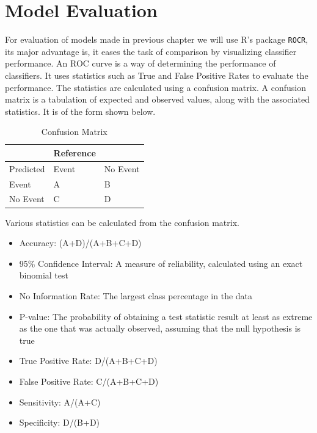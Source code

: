 \documentclass[a4paper,10pt]{report}\usepackage[]{graphicx}\usepackage[]{color}
\begin{document}
\chapter{Model Evaluation}
For evaluation of models made in previous chapter we will use R's package \texttt{ROCR}, its major advantage is, it eases the task of comparison by visualizing classifier performance.
An ROC curve is a way of determining the performance of classifiers. It uses statistics such as True and False Positive Rates to evaluate the performance. The statistics are calculated using a confusion matrix. 
A confusion matrix is a tabulation of expected and observed values, along with the associated statistics. It is of the form shown below.

\begin{table}[h]
  \begin{center}
    \begin{tabular}{|l|l|l|}
    \hline
    ~          & Reference     & ~  \\ \hline
    Predicted  & Event         & No Event  \\ \hline
    Event      & A             & B \\
    No Event   & C             & D \\ \hline
    
    \end{tabular}
    \caption{Confusion Matrix}
  \end{center}
\end{table}  

Various statistics can be calculated from the confusion matrix.
\begin{itemize}
  \item{Accuracy: (A+D)/(A+B+C+D)}
  \item{95\% Confidence Interval: A measure of reliability, calculated using an exact binomial test}
  \item{No Information Rate: The largest class percentage in the data}
  \item{P-value: The probability of obtaining a test statistic result at least as extreme as the one that was actually observed, assuming that the null hypothesis is true}
  \item{True Positive Rate: D/(A+B+C+D)}
  \item{False Positive Rate: C/(A+B+C+D) }
  \item{Sensitivity: A/(A+C)}
  \item{Specificity: D/(B+D)}
\end{itemize}
\end{document}

